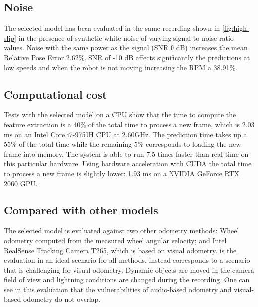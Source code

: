 \subsection{Noise} The selected model has been evaluated in the same recording
shown in \cref{fig:high-slip} in the presence of synthetic white noise of
varying signal-to-noise ratio values. Noise with the same power as the signal
(SNR 0 dB) increases the mean Relative Pose Error 2.62\%. SNR of -10 dB affects
significantly the predictions at low speeds and when the robot is not moving
increasing the RPM a 38.91\%.


\subsection{Computational cost} Tests with the selected model on a CPU show
that the time to compute the feature extraction is a 40\% of the total time to
process a new frame, which is 2.03 ms on an Intel\textregistered{}
Core\texttrademark{} i7-9750H CPU at 2.60GHz. The prediction time takes up a
55\% of the total time while the remaining 5\% corresponds to loading the new
frame into memory. The system is able to run 7.5 times faster than real time on
this particular hardware. Using hardware acceleration with CUDA the total time
to process a new frame is slightly lower: 1.93 ms on a NVIDIA GeForce RTX 2060
GPU.

\subsection{Compared with other models} The selected model is evaluated against
two other odometry methods: Wheel odometry computed from the measured wheel
angular velocity; and Intel\textregistered{} RealSense\texttrademark{} Tracking
Camera T265, which is based on visual odometry.  is the
evaluation in an ideal scenario for all methods. 
instead corresponds to a scenario that is challenging for visual odometry.
Dynamic objects are moved in the camera field of view and lightning conditions
are changed during the recording. One can see in this evaluation that the
vulnerabilities of audio-based odometry and visual-based odometry do not
overlap.

